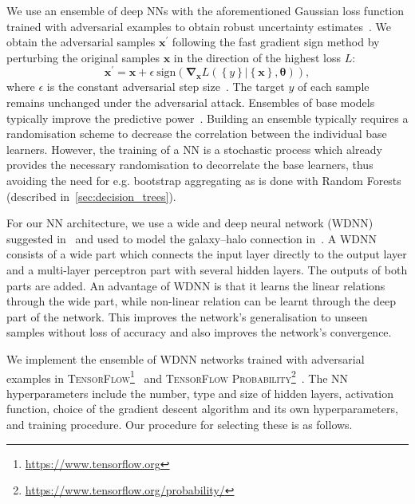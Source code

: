 \documentclass[usenatbib,useAMS]{mnras}
\begin{document}
We use an ensemble of deep \acp{NN} with the aforementioned Gaussian loss function trained with adversarial examples to obtain robust uncertainty estimates~\citep{Lakshminarayanan_deep_ensembles}.
We obtain the adversarial samples $\bm{x}^\prime$ following the fast gradient sign method by perturbing the original samples $\bm{x}$ in the direction of the highest loss $L$:
\begin{equation}\label{eq:fast_gradient}
    \bm{x}^\prime
    =
    \bm{x} + \epsilon~\mathrm{sign}\left(\bm{\nabla}_{\bm x} L\left(\left\{y\right\} | \left\{\bm{x}\right\}, \bm{\bm{\theta}}\right)\right),
\end{equation}
where $\epsilon$ is the constant adversarial step size~\citep{Goodfellow_adversarial_examples}. The target $y$ of each sample remains unchanged under the adversarial attack.
Ensembles of base models typically improve the predictive power~\citep{Dietterich_ensembles}. Building an ensemble typically requires a randomisation scheme to decrease the correlation between the individual base learners. However, the training of a \ac{NN} is a stochastic process which already provides the necessary randomisation to decorrelate the base learners, thus avoiding the need for e.g. bootstrap aggregating as is done with Random Forests (described in~\cref{sec:decision_trees}).

For our \ac{NN} architecture, we use a wide and deep neural network (WDNN) suggested in~\cite{Cheng_wide_deep} and used to model the galaxy--halo connection in~\cite{Moster_GalaxyNet}. A WDNN consists of a wide part which connects the input layer directly to the output layer and a multi-layer perceptron part with several hidden layers. The outputs of both parts are added. An advantage of WDNN is that it learns the linear relations through the wide part, while non-linear relation can be learnt through the deep part of the network. This improves the network's generalisation to unseen samples without loss of accuracy and also improves the network's convergence.

We implement the ensemble of WDNN networks trained with adversarial examples in \textsc{TensorFlow}\footnote{\url{https://www.tensorflow.org}}~\citep{tensorflow2015-whitepaper} and \textsc{TensorFlow Probability}\footnote{\url{https://www.tensorflow.org/probability/}}~\citep{TensorFlow_probability}. The \ac{NN} hyperparameters include the number, type and size of hidden layers, activation function, choice of the gradient descent algorithm and its own hyperparameters, and training procedure. Our procedure for selecting these is as follows.
\end{document}
